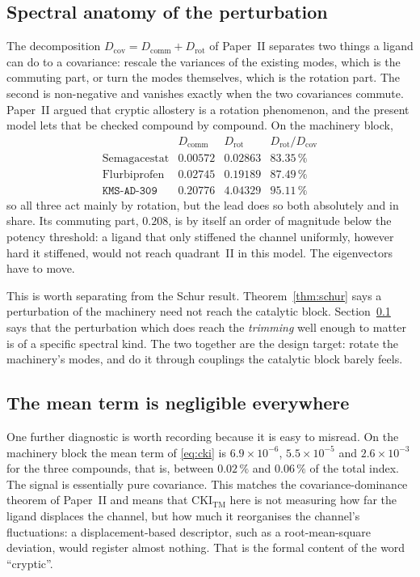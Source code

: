 \documentclass[11pt,reqno]{amsart}
\theoremstyle{plain}
\theoremstyle{definition}
\theoremstyle{remark}
\numberwithin{equation}{section}
\newcommand{\CKI}{\mathrm{CKI}}
\newcommand{\CKItm}{\CKI_{\mathrm{TM}}}
\newcommand{\lead}{\texttt{KMS-AD-309}}
\begin{document}
\subsection{Spectral anatomy of the perturbation}
\label{sec:anatomy}
The decomposition $D_{\mathrm{cov}}=D_{\mathrm{comm}}+D_{\mathrm{rot}}$ of Paper~II separates two things a ligand can do to a covariance: rescale the variances of the existing modes, which is the commuting part, or turn the modes themselves, which is the rotation part. The second is non-negative and vanishes exactly when the two covariances commute. Paper~II argued that cryptic allostery is a rotation phenomenon, and the present model lets that be checked compound by compound. On the machinery block,
\[
\begin{array}{lccc}
 & D_{\mathrm{comm}} & D_{\mathrm{rot}} & D_{\mathrm{rot}}/D_{\mathrm{cov}}\\[2pt]
\text{Semagacestat} & 0.00572 & 0.02863 & 83.35\,\%\\
\text{Flurbiprofen} & 0.02745 & 0.19189 & 87.49\,\%\\
\lead{} & 0.20776 & 4.04329 & 95.11\,\%
\end{array}
\]
so all three act mainly by rotation, but the lead does so both absolutely and in share. Its commuting part, $0.208$, is by itself an order of magnitude below the potency threshold: a ligand that only stiffened the channel uniformly, however hard it stiffened, would not reach quadrant~II in this model. The eigenvectors have to move.

This is worth separating from the Schur result. Theorem~\ref{thm:schur} says a perturbation of the machinery need not reach the catalytic block. Section~\ref{sec:anatomy} says that the perturbation which does reach the \emph{trimming} well enough to matter is of a specific spectral kind. The two together are the design target: rotate the machinery's modes, and do it through couplings the catalytic block barely feels.

\subsection{The mean term is negligible everywhere}
One further diagnostic is worth recording because it is easy to misread. On the machinery block the mean term of \eqref{eq:cki} is $6.9\times10^{-6}$, $5.5\times10^{-5}$ and $2.6\times10^{-3}$ for the three compounds, that is, between $0.02\,\%$ and $0.06\,\%$ of the total index. The signal is essentially pure covariance. This matches the covariance-dominance theorem of Paper~II and means that $\CKItm$ here is not measuring how far the ligand displaces the channel, but how much it reorganises the channel's fluctuations: a displacement-based descriptor, such as a root-mean-square deviation, would register almost nothing. That is the formal content of the word ``cryptic''.
\end{document}
